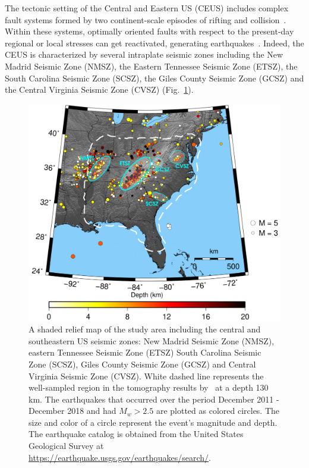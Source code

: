 \documentclass[draft,linenumbers]{agujournal2018}
\begin{document}
    The tectonic setting of the Central and Eastern US (CEUS) includes complex fault systems formed by two continent-scale episodes of rifting and collision~\citep[e.g.,][]{keller1983role, hoffman1989precambrian, thomas2006tectonic}. Within these systems, optimally oriented faults with respect to the present-day regional or local stresses can get reactivated, generating earthquakes~\citep[e.g.,][]{zoback1992stress, hurd2012intraplate}. Indeed, the CEUS is characterized by several intraplate seismic zones including the New Madrid Seismic Zone (NMSZ), the Eastern Tennessee Seismic Zone (ETSZ), the South Carolina Seismic Zone (SCSZ), the Giles County Seismic Zone (GCSZ) and the Central Virginia Seismic Zone (CVSZ) (Fig.~\ref{figone}). 
    
\begin{figure}[ht]
    \centering
    \includegraphics[width=32pc]{figures/seismicity_new.png}
    \caption{ A shaded relief map of the study area including the central and southeastern US seismic zones: New Madrid Seismic Zone (NMSZ), eastern Tennessee  Seismic Zone (ETSZ) South Carolina Seismic Zone (SCSZ), Giles County Seismic Zone (GCSZ) and Central Virginia Seismic Zone (CVSZ). White dashed line represents the well-sampled region in the tomography results by~\citet{Biryol_2016} at a depth 130 km. The earthquakes that occurred over the period December 2011 - December 2018 and had $M_{w} > 2.5$ are plotted as colored circles. The size and color of a circle represent the event's magnitude and depth. The earthquake catalog is obtained from the United States Geological Survey at \url{https://earthquake.usgs.gov/earthquakes/search/}.}
    \label{figone}
 \end{figure}
    
\end{document}
